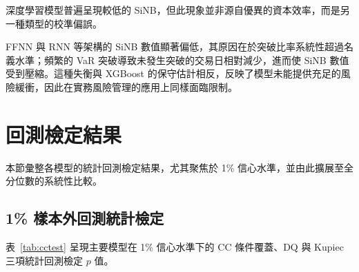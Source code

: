 深度學習模型普遍呈現較低的 SiNB，但此現象並非源自優異的資本效率，而是另一種類型的校準偏誤。

FFNN 與 RNN 等架構的 SiNB 數值顯著偏低，其原因在於突破比率系統性超過名義水準；頻繁的 VaR 突破導致未發生突破的交易日相對減少，進而使 SiNB 數值受到壓縮。這種失衡與 XGBoost 的保守估計相反，反映了模型未能提供充足的風險緩衝，因此在實務風險管理的應用上同樣面臨限制。


\section{回測檢定結果}
\label{sec:backtests}

本節彙整各模型的統計回測檢定結果，尤其聚焦於 1\% 信心水準，並由此擴展至全分位數的系統性比較。

\subsection{1\% 樣本外回測統計檢定}
\label{sec:backtests_1pct}

表~\ref{tab:cctest} 呈現主要模型在 1\% 信心水準下的 CC 條件覆蓋、DQ 與 Kupiec 三項統計回測檢定 $p$ 值。

